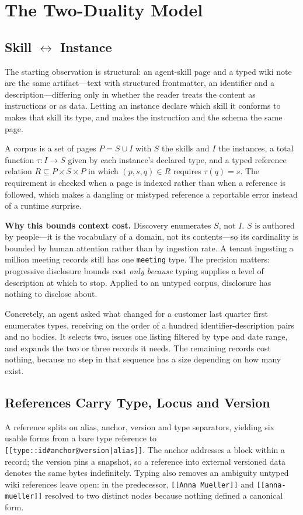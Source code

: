 \documentclass[journal,nofonttune]{IEEEtran}
\begin{document}
\section{The Two-Duality Model}
\label{sec:model}

\subsection{Skill $\leftrightarrow$ Instance}
The starting observation is structural: an agent-skill page and a typed wiki
note are the same artifact---text with structured frontmatter, an identifier
and a description---differing only in whether the reader treats the content as
instructions or as data. Letting an instance declare which skill it conforms
to makes that skill its type, and makes the instruction and the schema the
same page.

A corpus is a set of pages $P = S \cup I$ with $S$ the skills and $I$ the
instances, a total function $\tau : I \rightarrow S$ given by each instance's
declared type, and a typed reference relation $R \subseteq P \times S \times
P$ in which $(p, s, q) \in R$ requires $\tau(q) = s$. The requirement is
checked when a page is indexed rather than when a reference is followed,
which makes a dangling or mistyped reference a reportable error instead of a
runtime surprise.

\textbf{Why this bounds context cost.} Discovery enumerates $S$, not $I$. $S$
is authored by people---it is the vocabulary of a domain, not its
contents---so its cardinality is bounded by human attention rather than by
ingestion rate. A tenant ingesting a million meeting records still has one
\texttt{meeting} type. The precision matters: progressive disclosure bounds
cost \emph{only because} typing supplies a level of description at which to
stop. Applied to an untyped corpus, disclosure has nothing to disclose about.

Concretely, an agent asked what changed for a customer last quarter first
enumerates types, receiving on the order of a hundred identifier-description
pairs and no bodies. It selects two, issues one listing filtered by type and
date range, and expands the two or three records it needs. The remaining
records cost nothing, because no step in that sequence has a size depending
on how many exist.

\subsection{References Carry Type, Locus and Version}
A reference splits on alias, anchor, version and type separators, yielding
six usable forms from a bare type reference to
\texttt{[[type::id\#anchor@version|alias]]}. The anchor addresses a block
within a record; the version pins a snapshot, so a reference into external
versioned data denotes the same bytes indefinitely. Typing also removes an
ambiguity untyped wiki references leave open: in the predecessor,
\texttt{[[Anna Mueller]]} and \texttt{[[anna-mueller]]} resolved to two
distinct nodes because nothing defined a canonical form.
\end{document}
